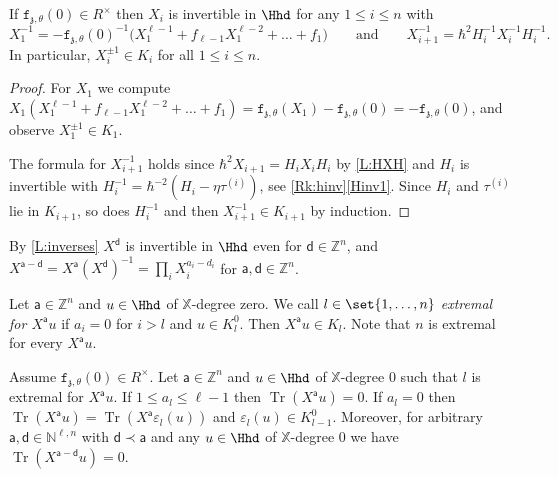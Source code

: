 \documentclass[a4paper,11pt]{amsart}
\newcommand{\Tr}{\op{Tr}}
\numberwithin{equation}{subsection}
\theoremstyle{definition}
\theoremstyle{theorem}
\theoremstyle{remark}
\newcommand\charge{{\mathfrak{z}}}
\newcommand\fct{\mathtt{f}_{\charge,\theta}}
\newcommand\tl{l}
\newcommand\Kr[1]{K_{#1}}
\newcommand\Kz[1]{K^{0}_{#1}}
\newcommand\ba{\mathsf{a}}
\newcommand\bd{\mathsf{d}}
\newcommand\op{\operatorname}
\newcommand\taui[1][i]{\tau^{(#1)}}
\newcommand\N{\mathbb{N}}
\newcommand\X{\mathbb{X}}
\newcommand\Z{\mathbb{Z}}
\begin{document}
\begin{Lemma}\label{L:inverses}
If $\fct(0)\in R^{\times}$ then $X_i$ is invertible in $\Hhd$ for any $1\leq i\leq n$ with   \[
    X_1^{-1}=-\fct(0)^{-1}\bigl(X_1^{\ell-1}+f_{\ell-1}X_1^{\ell-2}+\dots+f_1\bigr)\qquad\text{and}\qquad
    X_{i+1}^{-1}=\hbar^{2}H_i^{-1}X_i^{-1}H_i^{-1}.
  \]
  In particular, $X_i^{\pm1}\in\Kr{i}$  for all $1\leq i\leq n$.
\end{Lemma}
\begin{proof}For $X_1$ we compute $X_1(X_1^{\ell-1}+f_{\ell-1}X_1^{\ell-2}+\dots+f_1)=\fct(X_1)-\fct(0)=-\fct(0)$, and observe  $X_1^{\pm1}\in\Kr{1}$.

The formula for  $X_{i+1}^{-1}$ holds since $\hbar^2X_{i+1}=H_iX_iH_i$ by \autoref{L:HXH} and $H_i$ is invertible with $H_i^{-1}=\hbar^{-2}(H_i-\eta\taui)$, see \autoref{Rk:hinv}\autoref{Hinv1}. Since $H_i$ and $\taui$ lie in $\Kr{i+1}$, so does $H_i^{-1}$ and then $X_{i+1}^{-1}\in\Kr{i+1}$ by induction.
\end{proof}

By \autoref{L:inverses} $X^{\bd}$ is invertible in $\Hhd$ even for $\bd\in\Z^{n}$, and $X^{\ba-\bd}=X^{\ba}(X^{\bd})^{-1}=\prod_iX_i^{a_i-d_i}$ for $\ba,\bd\in\Z^{n}$.

  Let $\ba\in\Z^{n}$ and $u\in\Hhd$ of $\X$-degree zero. We call $\tl\in\set{1,\dots,n}$ \emph{extremal for $X^{\ba}u$} if $a_i=0$ for $i>\tl$ and $u\in\Kz{\tl}$. Then $X^{\ba}u\in\Kr{\tl}$. Note that $n$ is extremal for every $X^{\ba}u$.

\begin{Lemma}\label{MMargument}
  Assume $\fct(0)\in R^{\times}$. Let $\ba\in\Z^n$ and $u\in\Hhd$ of $\X$-degree $0$ such that $\tl$ is extremal for $X^{\mathsf a}u$.  If $1\leq a_{\tl}\leq\ell-1$ then $\Tr(X^{\ba}u)=0$. If $a_{\tl}=0$ then $\Tr(X^{\ba}u)=\Tr(X^{\ba}\varepsilon_{\tl}(u))$ and $\varepsilon_{\tl}(u)\in\Kz{\tl-1}$. Moreover, for arbitrary $\ba,\bd\in\N^{\ell,n}$ with $\bd\prec\ba$ and any $u\in\Hhd$ of $\X$-degree $0$ we have $\Tr(X^{\ba-\bd}u)=0$.
 \end{Lemma}
\end{document}
